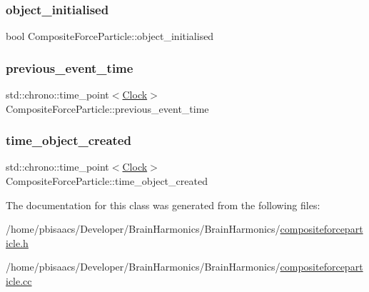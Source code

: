 \subsubsection{\texorpdfstring{object\+\_\+initialised}{object\_initialised}}
{\footnotesize\ttfamily bool Composite\+Force\+Particle\+::object\+\_\+initialised\hspace{0.3cm}{\ttfamily [private]}}

\mbox{\label{classCompositeForceParticle_ad9b33180a06a93964c089b698067e9c5}} 
\subsubsection{\texorpdfstring{previous\+\_\+event\+\_\+time}{previous\_event\_time}}
{\footnotesize\ttfamily std\+::chrono\+::time\+\_\+point$<$\mbox{\hyperlink{universe_8h_a0ef8d951d1ca5ab3cfaf7ab4c7a6fd80}{Clock}}$>$ Composite\+Force\+Particle\+::previous\+\_\+event\+\_\+time\hspace{0.3cm}{\ttfamily [private]}}

\mbox{\label{classCompositeForceParticle_a71308d96b2ba9adaebf20715af14c695}} 
\subsubsection{\texorpdfstring{time\+\_\+object\+\_\+created}{time\_object\_created}}
{\footnotesize\ttfamily std\+::chrono\+::time\+\_\+point$<$\mbox{\hyperlink{universe_8h_a0ef8d951d1ca5ab3cfaf7ab4c7a6fd80}{Clock}}$>$ Composite\+Force\+Particle\+::time\+\_\+object\+\_\+created\hspace{0.3cm}{\ttfamily [private]}}



The documentation for this class was generated from the following files\+:\begin{DoxyCompactItemize}
\item 
/home/pbisaacs/\+Developer/\+Brain\+Harmonics/\+Brain\+Harmonics/\mbox{\hyperlink{compositeforceparticle_8h}{compositeforceparticle.\+h}}\item 
/home/pbisaacs/\+Developer/\+Brain\+Harmonics/\+Brain\+Harmonics/\mbox{\hyperlink{compositeforceparticle_8cc}{compositeforceparticle.\+cc}}\end{DoxyCompactItemize}
